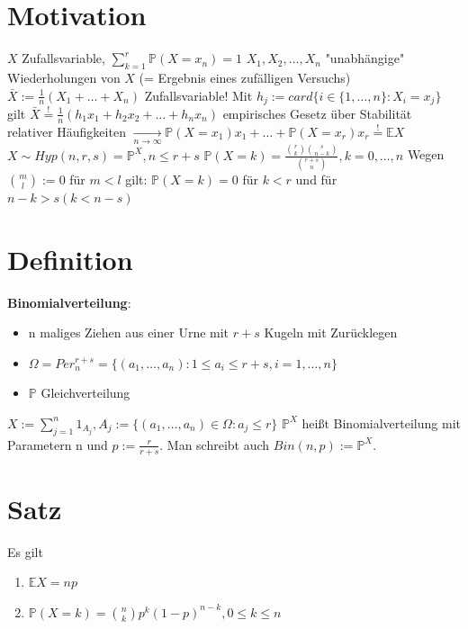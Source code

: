 \documentclass[a4paper,11pt,notitlepage]{report}
\newcommand{\Prim}{{\ensuremath{\mathbb{P}}}}
\newcommand{\E}{{\ensuremath{\mathbb{E}}}}
\begin{document}
\section{Motivation}
$X$ Zufallsvariable, $\sum\limits_{k=1}^r{\Prim(X=x_n)} = 1$
\newline
$X_1, X_2, \ldots, X_n$ "unabhängige" Wiederholungen von $X$ (= Ergebnis eines zufälligen Versuchs)
\newline
$\bar{X}:=\frac{1}{n}(X_1 + \ldots + X_n)$ Zufallsvariable!
\newline
Mit $h_j := card\{i \in \{1,\ldots,n\} \colon X_i = x_j \}$ gilt $\bar{X} \overset{!}{=} \frac{1}{n}(h_1x_1 + h_2x_2 + \ldots + h_nx_n)$
\newline
empirisches Gesetz über Stabilität relativer Häufigkeiten
\newline
$\underset{n \rightarrow \infty}{\rightarrow} \Prim(X=x_1)x_1 + \ldots + \Prim(X=x_r)x_r \overset{!}{=} \E X$
\newline
$X \sim Hyp(n,r,s) = \Prim^X, n \leq r +s$
\newline
$\Prim(X=k)=\frac{
			{{r \choose k}{s \choose {n-k}}}}{{{r+s}\choose n}}, k = 0, \ldots, n$
\newline
Wegen ${m \choose l}:= 0$ für $m<l$ gilt:
$\Prim(X=k)=0$ für $k < r$ und für $n-k>s (k < n-s)$

\section{Definition}
\textbf{Binomialverteilung}:
\begin{itemize}
	\item n maliges Ziehen aus einer Urne mit $r+s$ Kugeln mit Zurücklegen
	\item $\Omega = Per_n^{r+s} = \{(a_1,\ldots,a_n) \colon 1 \leq a_i \leq r+s, i = 1, \ldots, n\}$
	\item $\Prim$ Gleichverteilung
\end{itemize}
$X:= \sum\limits_{j=1}^n {1_{A_j}}, A_j := \{(a_1,\ldots,a_n) \in \Omega \colon a_j \leq r\}$
\newline
$\Prim^X$ heißt Binomialverteilung mit Parametern n und $p:=\frac{r}{r+s}$. Man schreibt auch $Bin(n,p):=\Prim^X$.

\section{Satz}
Es gilt
\begin{enumerate}
	\item $\E X = np$
	\item $\Prim(X=k)= {n \choose k} p^k (1-p)^{n-k}, 0 \leq k \leq n$
\end{enumerate}
\end{document}
